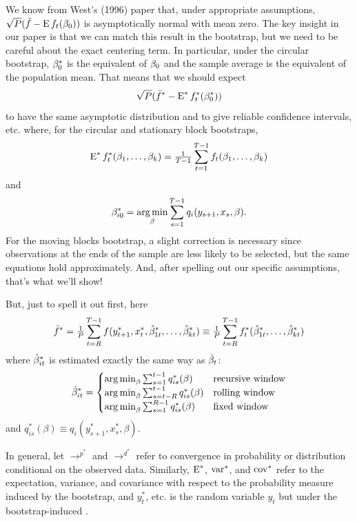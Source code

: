 \documentclass[12pt,fleqn]{article}
\begin{document}
We know from West's (1996) paper that, under appropriate assumptions,
$\sqrt{P} (\bar f - \operatorname{E} f_t(\beta_0))$ is asymptotically normal with mean
zero. The key insight in our paper is that we can match this result in
the bootstrap, but we need to be careful about the exact centering
term.  In particular, under the circular bootstrap, $\beta_0^*$ is the
equivalent of $\beta_0$ and the sample average is the equivalent of the
population mean. That means that we should expect
\begin{equation*}
  \sqrt{P} (\bar f^* - \operatorname{E}^* f_t^*(\beta_0^*))
\end{equation*}
to have the same asymptotic distribution and to give reliable
confidence intervals, etc. where, for the circular and stationary
block bootstraps,
\begin{equation*}
  \operatorname{E}^* f_t^*(\beta_1,\dots,\beta_k) = \tfrac{1}{T-1} \sum_{t=1}^{T-1} f_t(\beta_1,\dots,\beta_k)
\end{equation*}
and
\begin{equation*}
  \beta_{i0}^* = \operatorname*{arg\,min}_\beta \sum_{s=1}^{T-1} q_i(y_{s+1}, x_s, \beta).
\end{equation*}
For the moving blocks bootstrap, a slight correction is necessary
since observations at the ends of the sample are less likely to be
selected, but the same equations hold approximately. And, after
spelling out our specific assumptions, that's what we'll show!

But, just to spell it out first, here
\begin{equation}
  \bar f^* = \tfrac{1}{P} \sum_{t=R}^{T-1} f(y_{t+1}^*, x_t^*, \hat \beta_{1t}^*,\dots,\hat \beta_{kt}^*)
  \equiv \tfrac{1}{P} \sum_{t=R}^{T-1} f_t^*(\hat \beta_{1t}^*,\dots,\hat \beta_{kt}^*)
\end{equation}
where $\hat \beta_{it}^*$ is estimated exactly the same way as $\hat \beta_t$:
\begin{equation}\label{eq:10}
  \hat\beta_{it}^* = \begin{cases}
    \operatorname*{arg\,min}_\beta \sum_{s=1}^{t-1} q_{is}^*(\beta) & \text{recursive window} \\
    \operatorname*{arg\,min}_\beta \sum_{s=t-R}^{t-1} q_{is}^*(\beta) & \text{rolling window} \\
    \operatorname*{arg\,min}_\beta \sum_{s=1}^{R-1} q_{is}^*(\beta) & \text{fixed window}
  \end{cases}
\end{equation}
and $q_{is}^*(\beta) \equiv q_i(y_{s+1}^*, x_s^*, \beta)$.

In general, let $\to^{p^{*}}$ and
$\to^{d^{*}}$ refer to convergence in probability or distribution
conditional on the observed data.  Similarly, $\operatorname{E}^{*}$, $\operatorname{var}^{*}$,
and $\operatorname{cov}^{*}$ refer to the expectation, variance, and covariance with
respect to the probability measure induced by the bootstrap, and
$y_t^{*}$, etc. is the random variable $y_t$ but under the
bootstrap-induced \cdf.
\end{document}
